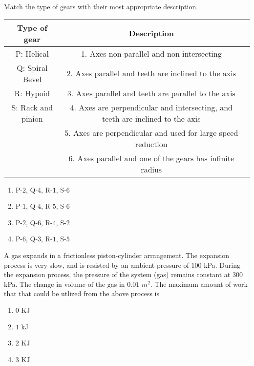     \item Match the type of gears with their most appropriate description.\\
    \begin{tabular}{|c|c|p{1cm}|}
    \hline
    \textbf{Type of gear} & \textbf{Description} \\
    \hline
    P: Helical & 1. Axes non-parallel and non-intersecting \\
    \hline
    Q: Spiral Bevel & 2. Axes parallel and teeth are inclined to the axis \\
    \hline
    R: Hypoid & 3. Axes parallel and teeth are parallel to the axis \\
    \hline
    S: Rack and pinion & 4. Axes are perpendicular and intersecting, and teeth are inclined to the axis \\
    \hline
    & 5. Axes are perpendicular and used for large speed reduction \\
    \hline
    & 6. Axes parallel and one of the gears has infinite radius \\
    \hline 
    \end{tabular}
    
    \begin{multicols}{2}
    \begin{enumerate}
        \item P-$2$, Q-$4$, R-$1$, S-$6$
        \item P-$1$, Q-$4$, R-$5$, S-$6$
        \item P-$2$, Q-$6$, R-$4$, S-$2$
        \item P-$6$, Q-$3$, R-$1$, S-$5$
    \end{enumerate}
    \end{multicols}

    \item A gas expands in a frictionless piston-cylinder arrangement. The expansion process is very slow, and is resisted by an ambient pressure of $100$ kPa. During the expansion process, the pressure of the system (gas) remains constant at $300$ kPa. The change in volume of the gas in $0.01$ $m^2$. The maximum amount of work that that could be utlized from the above process is
    \begin{multicols}{4}
    \begin{enumerate}
        \item $0$ KJ
        \item $1$ kJ
        \item $2$ KJ
        \item $3$ KJ
    \end{enumerate}
    \end{multicols}

